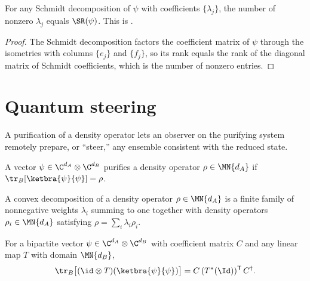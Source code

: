\begin{theorem}
    \label{thm:schmidt_rank_of_schmidt_decomposition}
    \leanok
    For any Schmidt decomposition of $\psi$ with coefficients
    $\{\lambda_j\}$, the number of nonzero $\lambda_j$ equals $\SR(\psi)$.
    This is \cite[Proposition~1.1]{Wolf2012Quantum}.
\end{theorem}

\begin{proof}\leanok
    The Schmidt decomposition factors the coefficient matrix of $\psi$
    through the isometries with columns $\{e_j\}$ and $\{f_j\}$, so its rank
    equals the rank of the diagonal matrix of Schmidt coefficients, which is
    the number of nonzero entries.
\end{proof}

\section{Quantum steering}

A purification of a density operator lets an observer on the purifying
system remotely prepare, or ``steer,'' any ensemble consistent with the
reduced state.

\begin{definition}[Purification]\label{def:purification}
    \leanok
    A vector $\psi\in\C^{d_A}\otimes\C^{d_B}$ purifies a density operator
    $\rho\in\MN{d_A}$ if $\tr_B[\ketbra{\psi}{\psi}]=\rho$.
\end{definition}

\begin{definition}\label{def:convex_decomposition}
    \leanok
    A convex decomposition of a density operator $\rho\in\MN{d_A}$ is a
    finite family of nonnegative weights $\lambda_i$ summing to one together
    with density operators $\rho_i\in\MN{d_A}$ satisfying
    $\rho=\sum_i\lambda_i\rho_i$.
\end{definition}

\begin{theorem}\label{thm:transpose_trick}
    \leanok
    For a bipartite vector $\psi\in\C^{d_A}\otimes\C^{d_B}$ with coefficient
    matrix $C$ and any linear map $T$ with domain $\MN{d_B}$,
    \begin{align}
        \tr_B\bigl[(\id\otimes T)(\ketbra{\psi}{\psi})\bigr] = C\,(T^*(\Id))^{\mathsf T}\,C^\dagger.
        \notag
    \end{align}
\end{theorem}

